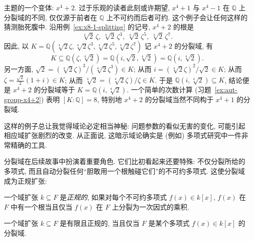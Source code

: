 \begin{example}\label{ex:x4+2-splitting}
主题的一个变体: $x^4+2$. 过于乐观的读者此刻或许期望, $x^4+1$ 与 $x^4-1$ 在 $\mathbb{Q}$ 上分裂域的不同, 仅仅源于前者在 $\mathbb{Q}$ 上不可约而后者可约. 这个例子会让任何这样的猜测胎死腹中. 沿用例~\ref{ex:x8-1-splitting} 的记号, $x^4+2$ 的根是
\[
\sqrt[4]{2}\,\zeta,\ \sqrt[4]{2}\,\zeta^3,\ \sqrt[4]{2}\,\zeta^5,\ \sqrt[4]{2}\,\zeta^7.
\]
因此, 以 $K=\mathbb{Q}(\sqrt[4]{2}\zeta,\sqrt[4]{2}\zeta^3,\sqrt[4]{2}\zeta^5,\sqrt[4]{2}\zeta^7)$ 记 $x^4+2$ 的分裂域, 有
\[
K\subseteq\mathbb{Q}(\zeta,\sqrt[4]{2})=\mathbb{Q}(i,\sqrt{2},\sqrt[4]{2})=\mathbb{Q}(i,\sqrt[4]{2}).
\]
另一方面, $\sqrt{2}=(\sqrt[4]{2}\zeta)^3/(\sqrt[4]{2}\zeta^3)\in K$; 从而 $i=(\sqrt[4]{2}\zeta)^2/\sqrt{2}\in K$; 从而 $\zeta=\frac{\sqrt{2}}{2}(1+i)\in K$; 从而 $\sqrt[4]{2}=(\sqrt[4]{2}\zeta)/\zeta\in K$. 于是 $\mathbb{Q}(i,\sqrt[4]{2})\subseteq K$, 结论便是 $x^4+2$ 的分裂域等于 $K=\mathbb{Q}(i,\sqrt[4]{2})$. 一个简单的次数计算 (习题~\ref{ex:aut-group-x4+2}) 表明 $[K:\mathbb{Q}]=8$, 特别地 $x^4+2$ 的分裂域当然不同构于 $x^4+1$ 的分裂域.

这样的例子总让我觉得域论必定相当神秘: 问题参数的看似无害的变化, 可能引起相应域扩张剧烈的改变. 从正面说, 这暗示域论确实是 (例如) 多项式研究中一件非常精确的工具.
\end{example}

分裂域在后续故事中扮演着重要角色. 它们比初看起来还要特殊: 不仅分裂所给的多项式, 而且自动分裂任何``胆敢用一个根触碰它们''的不可约多项式. 这使分裂域成为正规扩张:

\begin{definition}\label{def:normal-extension}
一个域扩张 $k\subseteq F$ 是\emph{正规的}, 如果对每个不可约多项式 $f(x)\in k[x]$, $f(x)$ 在 $F$ 中有一个根当且仅当 $f(x)$ 在 $F$ 上分裂为一次因式的乘积.
\end{definition}

\begin{theorem}\label{thm:finite-normal-splitting}
一个域扩张 $k\subseteq F$ 是有限且正规的, 当且仅当 $F$ 是某个多项式 $f(x)\in k[x]$ 的分裂域.
\end{theorem}

